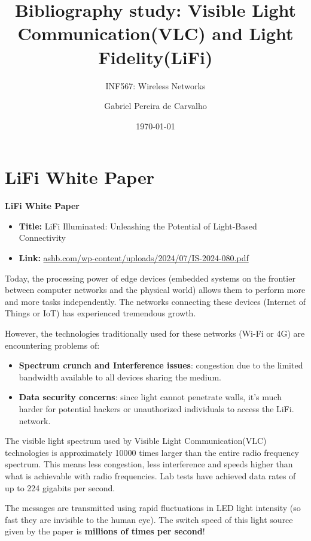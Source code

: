 \documentclass[a4paper,12pt,twoside]{article}
\title{Bibliography study: Visible Light Communication(VLC) and Light Fidelity(LiFi)}
\subtitle{INF567: Wireless Networks}
\author{Gabriel Pereira de Carvalho}
\date{\today}
\begin{document}
	
	\maketitle
	
	\tableofcontents
	
	\newpage
	
	\section{LiFi White Paper}
	\begin{tcolorbox}
		\centering \textbf{LiFi White Paper}
		\begin{itemize}
			\item \textbf{Title:} LiFi Illuminated: Unleashing the Potential of Light-Based Connectivity
			\item \textbf{Link:} \href{https://www.ashb.com/wp-content/uploads/2024/07/IS-2024-080.pdf}{ashb.com/wp-content/uploads/2024/07/IS-2024-080.pdf}
		\end{itemize}
	\end{tcolorbox}
	
	Today, the processing power of edge devices (embedded systems on the frontier between computer networks and the physical world) allows them to perform more and more tasks independently. The networks connecting these devices (Internet of Things or IoT) has experienced tremendous growth.
	
	However, the technologies traditionally used for these networks (Wi-Fi or 4G) are encountering problems of:
	
	\begin{itemize}
		\item \textbf{Spectrum crunch and Interference issues}: congestion due to the limited bandwidth available to all devices sharing the medium.
		\item \textbf{Data security concerns}:  since light cannot penetrate walls, it's much harder for potential hackers or unauthorized individuals to access the LiFi.
		network.
	\end{itemize}
	
	The visible light spectrum used by Visible Light Communication(VLC) technologies is approximately 10000 times larger than the entire radio frequency spectrum. This means less congestion, less interference and speeds higher than what is achievable with radio frequencies.  Lab tests have achieved data rates of up to 224 gigabits per second.
	
	The messages are transmitted using rapid fluctuations in LED light intensity (so fast they are invisible to the human eye). The switch speed of this light source given by the paper is \textbf{millions of times per second}!
	
\end{document}
